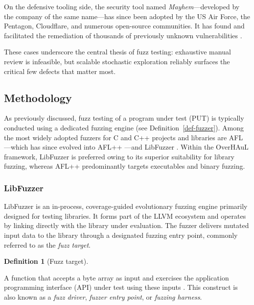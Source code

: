 \documentclass[
  a4paper,
  DIV=11,
  numbers=noendperiod]{scrreprt}
\theoremstyle{definition}
\newtheorem{definition}{Definition}[chapter]
\theoremstyle{remark}
\begin{document}
On the defensive tooling side, the security tool named
\emph{Mayhem}---developed by the company of the same name---has since
been adopted by the US Air Force, the Pentagon, Cloudflare, and numerous
open-source communities. It has found and facilitated the remediation of
thousands of previously unknown vulnerabilities
\autocite{simonite2020mayhem}.

These cases underscore the central thesis of fuzz testing: exhaustive
manual review is infeasible, but scalable stochastic exploration
reliably surfaces the critical few defects that matter most.

\subsection{Methodology}\label{methodology}

As previously discussed, fuzz testing of a program under test (PUT) is
typically conducted using a dedicated fuzzing engine (see
Definition~\ref{def-fuzzer}). Among the most widely adopted fuzzers for
C and C++ projects and libraries are AFL \autocite{afl}---which has
since evolved into AFL++ \autocite{aflpp}---and LibFuzzer
\autocite{libfuzzer}. Within the OverHAuL framework, LibFuzzer is
preferred owing to its superior suitability for library fuzzing, whereas
AFL++ predominantly targets executables and binary fuzzing.

\subsubsection{LibFuzzer}\label{libfuzzer}

LibFuzzer \autocite{libfuzzer} is an in-process, coverage-guided
evolutionary fuzzing engine primarily designed for testing libraries. It
forms part of the LLVM ecosystem \autocite{llvm} and operates by linking
directly with the library under evaluation. The fuzzer delivers mutated
input data to the library through a designated fuzzing entry point,
commonly referred to as the \emph{fuzz target}.

\begin{definition}[Fuzz
target]\protect\hypertarget{def-target}{}\label{def-target}

A function that accepts a byte array as input and exercises the
application programming interface (API) under test using these inputs
\autocite{libfuzzer}. This construct is also known as a \emph{fuzz
driver}, \emph{fuzzer entry point}, or \emph{fuzzing harness}.

\end{definition}
\end{document}
